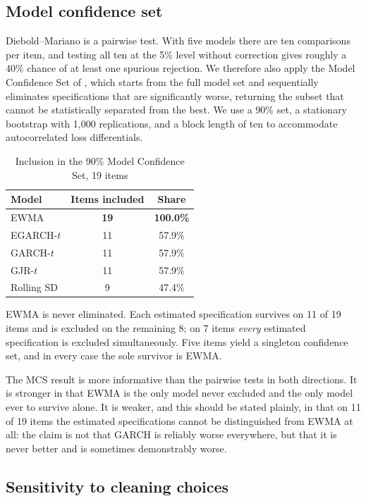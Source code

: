 \documentclass[11pt,a4paper]{article}
\begin{document}
\subsection{Model confidence set}

Diebold--Mariano is a pairwise test. With five models there are ten
comparisons per item, and testing all ten at the 5\% level without correction
gives roughly a 40\% chance of at least one spurious rejection. We therefore
also apply the Model Confidence Set of \citet{HLN2011}, which starts from the
full model set and sequentially eliminates specifications that are
significantly worse, returning the subset that cannot be statistically
separated from the best. We use a 90\% set, a stationary bootstrap with 1{,}000
replications, and a block length of ten to accommodate autocorrelated loss
differentials.

\begin{table}[htbp]
\centering
\caption{Inclusion in the 90\% Model Confidence Set, 19 items}
\label{tab:mcs}
\begin{tabular}{lcc}
\toprule
Model & Items included & Share \\
\midrule
EWMA        & \textbf{19} & \textbf{100.0\%} \\
EGARCH-$t$  & 11 & 57.9\% \\
GARCH-$t$   & 11 & 57.9\% \\
GJR-$t$     & 11 & 57.9\% \\
Rolling SD  & 9  & 47.4\% \\
\bottomrule
\end{tabular}
\end{table}

EWMA is never eliminated. Each estimated specification survives on 11 of 19
items and is excluded on the remaining 8; on 7 items \emph{every} estimated
specification is excluded simultaneously. Five items yield a singleton
confidence set, and in every case the sole survivor is EWMA.

The MCS result is more informative than the pairwise tests in both directions.
It is stronger in that EWMA is the only model never excluded and the only model
ever to survive alone. It is weaker, and this should be stated plainly, in that
on 11 of 19 items the estimated specifications cannot be distinguished from
EWMA at all: the claim is not that GARCH is reliably worse everywhere, but that
it is never better and is sometimes demonstrably worse.

\subsection{Sensitivity to cleaning choices}
\end{document}
